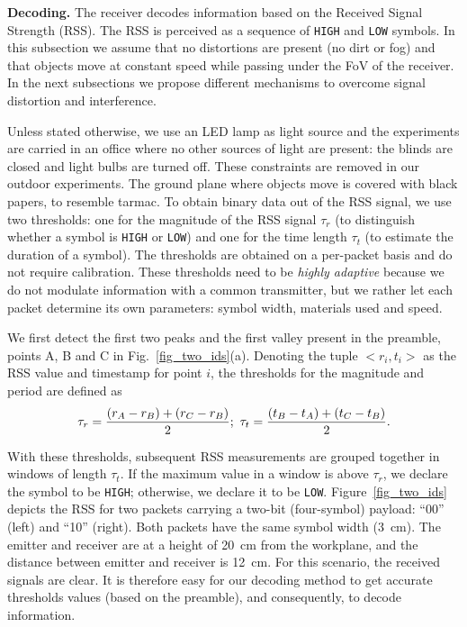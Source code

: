 \documentclass[10pt]{sig-alternate-05-2015}
\begin{document}
\textbf{Decoding.} The receiver decodes information based on the Received Signal Strength (RSS). The RSS is perceived as a sequence of  \texttt{HIGH} and \texttt{LOW} symbols. In this subsection we assume that no distortions are present (no dirt or fog) and that objects move at constant speed while passing under the FoV of the receiver. In the next subsections we propose different mechanisms to overcome signal distortion and interference.

Unless stated otherwise, we use an LED lamp as light source and the experiments are carried in an office where no other sources of light are present: the blinds are closed and light bulbs are turned off. These constraints are removed in our outdoor experiments. The ground plane where objects move is covered with black papers, to resemble tarmac. To obtain binary data out of the RSS signal, we use two thresholds: one for the magnitude of the RSS signal $\tau_r$ (to distinguish whether a symbol is \texttt{HIGH} or \texttt{LOW}) and one for the time length $\tau_t$ (to estimate the duration of a symbol). The thresholds are obtained on a per-packet basis and do not require calibration. These thresholds need to be \emph{highly adaptive} because we do not modulate information with a common transmitter, but we rather let each packet determine its own parameters: symbol width, materials used and speed.

We first detect the first two peaks and the first valley present in the preamble, points A, B and C in Fig.~\ref{fig_two_ids}(a). Denoting the tuple $<r_i,t_i>$ as the RSS value and timestamp for point $i$, the thresholds for the magnitude and period are defined as
\begin{align*}
	\tau_r = \frac{(r_A - r_B) + (r_C - r_B)}{2} ; \
	\hfill
	\tau_t = \frac{(t_B - t_A) + (t_C - t_B)}{2}.
\end{align*}

With these thresholds, subsequent RSS measurements are grouped together in windows of length $\tau_t$. If the maximum value in a window is above $\tau_r$, we declare the symbol to be \texttt{HIGH}; otherwise, we declare it to be \texttt{LOW}. Figure~\ref{fig_two_ids} depicts the RSS for two packets carrying a two-bit (four-symbol) payload: ``00'' (left) and ``10'' (right). Both packets have the same symbol width (3~cm). The emitter and receiver are at a height of 20~cm from the workplane, and the distance between emitter and receiver is 12~cm. For this scenario, the received signals are clear. It is therefore easy for our decoding method to get accurate thresholds values (based on the preamble), and consequently, to decode information.
\end{document}
